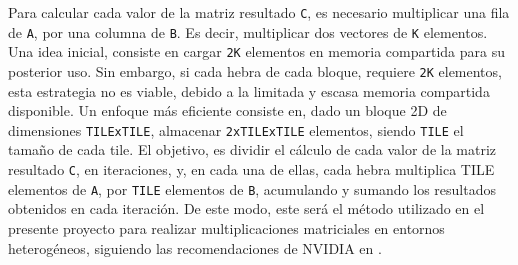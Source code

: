 Para calcular cada valor de la matriz resultado \texttt{C}, es necesario multiplicar una fila de \texttt{A}, por una columna de \texttt{B}. Es decir, multiplicar dos vectores de \texttt{K} elementos. Una idea inicial, consiste en cargar \texttt{2K} elementos en memoria compartida para su posterior uso. Sin embargo, si cada hebra de cada bloque, requiere \texttt{2K} elementos, esta estrategia no es viable, debido a la limitada y escasa memoria compartida disponible. Un enfoque más eficiente consiste en, dado un bloque 2D de dimensiones \texttt{TILExTILE}, almacenar \texttt{2xTILExTILE} elementos, siendo \texttt{TILE} el tamaño de cada tile. El objetivo, es dividir el cálculo de cada valor de la matriz resultado \texttt{C}, en iteraciones, y, en cada una de ellas, cada hebra multiplica TILE elementos de \texttt{A}, por \texttt{TILE} elementos de \texttt{B}, acumulando y sumando los resultados obtenidos en cada iteración. De este modo, este será el método utilizado en el presente proyecto para realizar multiplicaciones matriciales en entornos heterogéneos, siguiendo las recomendaciones de NVIDIA en \cite{nvidia_mult_matrix_v4}. \\
